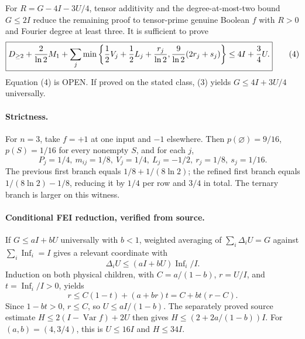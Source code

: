 For \(R=G-4I-3U/4\), tensor additivity and the degree-at-most-two bound \(G\le2I\) reduce the remaining proof to tensor-prime genuine Boolean \(f\) with \(R>0\) and Fourier degree at least three. It is sufficient to prove
\[
\boxed{D_{\ge2}+{2\over\ln2}M_1+
\sum_j\min\left\{
{1\over2}V_j+{1\over2}L_j+{r_j\over\ln2},
{9\over\ln2}(2r_j+s_j)
\right\}\le4I+{3\over4}U.}
\tag{4}
\]
Equation (4) is OPEN. If proved on the stated class, (3) yields \(G\le4I+3U/4\) universally.

\paragraph{Strictness.}
For \(n=3\), take \(f=+1\) at one input and \(-1\) elsewhere. Then \(p(\varnothing)=9/16\), \(p(S)=1/16\) for every nonempty \(S\), and for each \(j\),
\[
P_j=1/4,\ m_{ij}=1/8,\ V_j=1/4,\ L_j=-1/2,\ r_j=1/8,\ s_j=1/16.
\]
The previous first branch equals \(1/8+1/(8\ln2)\); the refined first branch equals \(1/(8\ln2)-1/8\), reducing it by \(1/4\) per row and \(3/4\) in total. The ternary branch is larger on this witness.

\paragraph{Conditional FEI reduction, verified from source.}
If \(G\le aI+bU\) universally with \(b<1\), weighted averaging of \(\sum_i\Delta_iU=G\) against \(\sum_i\operatorname{Inf}_i=I\) gives a relevant coordinate with
\[
\Delta_iU\le(aI+bU)\operatorname{Inf}_i/I.
\]
Induction on both physical children, with \(C=a/(1-b)\), \(r=U/I\), and \(t=\operatorname{Inf}_i/I>0\), yields
\[
r\le C(1-t)+(a+br)t=C+bt(r-C).
\]
Since \(1-bt>0\), \(r\le C\), so \(U\le aI/(1-b)\). The separately proved source estimate \(H\le2(I-\operatorname{Var}f)+2U\) then gives \(H\le(2+2a/(1-b))I\). For \((a,b)=(4,3/4)\), this is \(U\le16I\) and \(H\le34I\).